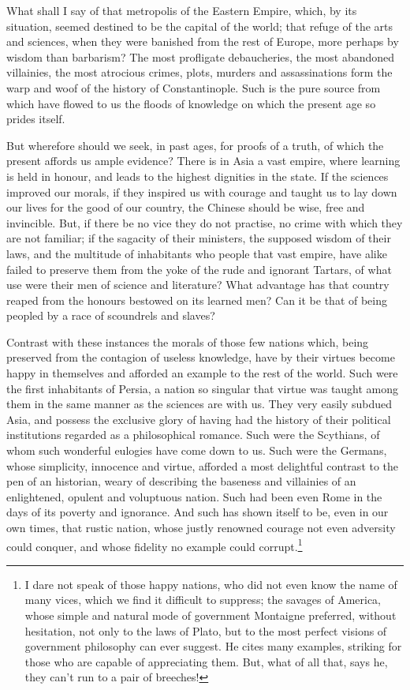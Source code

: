 What shall I say of that metropolis of the Eastern Empire, which, by
its situation, seemed destined to be the capital of the world; that
refuge of the arts and sciences, when they were banished from the rest
of Europe, more perhaps by wisdom than barbarism? The most profligate
debaucheries, the most abandoned villainies, the most atrocious
crimes, plots, murders and assassinations form  the warp and
woof of the history of Constantinople. Such is the pure source from
which have flowed to us the floods of knowledge on which the present
age so prides itself.

But wherefore should we seek, in past ages, for proofs of a truth, of
which the present affords us ample evidence? There is in Asia a vast
empire, where learning is held in honour, and leads to the highest
dignities in the state. If the sciences improved our morals, if they
inspired us with courage and taught us to lay down our lives for the
good of our country, the Chinese should be wise, free and invincible.
But, if there be no vice they do not practise, no crime with which
they are not familiar; if the sagacity of their ministers, the
supposed wisdom of their laws, and the multitude of inhabitants who
people that vast empire, have alike failed to preserve them from the
yoke of the rude and ignorant Tartars, of what use were their men of
science and literature? What advantage has that country reaped from
the honours bestowed on its learned men? Can it be that of being
peopled by a race of scoundrels and slaves?

Contrast with these instances the morals of those few nations which,
being preserved from the contagion of useless knowledge, have by their
virtues become happy in themselves and afforded an example to the rest
of the world. Such were the first inhabitants of Persia, a nation so
singular that virtue was taught among them in the same manner as the
sciences are with us. They very easily subdued Asia, and possess the
exclusive glory of having had the history of their political
institutions regarded as a philosophical romance. Such were the
Scythians, of whom such wonderful eulogies have come down to us. Such
were the Germans, whose simplicity, innocence and virtue, afforded a
most delightful contrast to the pen of an historian, weary of
describing the baseness and villainies of an enlightened, opulent and
voluptuous nation. Such had been even Rome in the days of its poverty
and ignorance. And such has shown itself to be, even in our own times,
that rustic nation, whose justly renowned courage not even adversity
could conquer, and whose fidelity no example could corrupt.\footnote{I
dare not speak of those happy nations, who did not even know the name
of many vices, which we find it difficult to suppress; the savages of
America, whose simple and natural mode of government Montaigne
preferred, without hesitation, not only to the laws of Plato, but to
the most perfect visions of government philosophy can ever suggest. He
cites many examples, striking for those who are capable of
appreciating them. But, what of all that, says he, they can't run to a
pair of breeches!}

